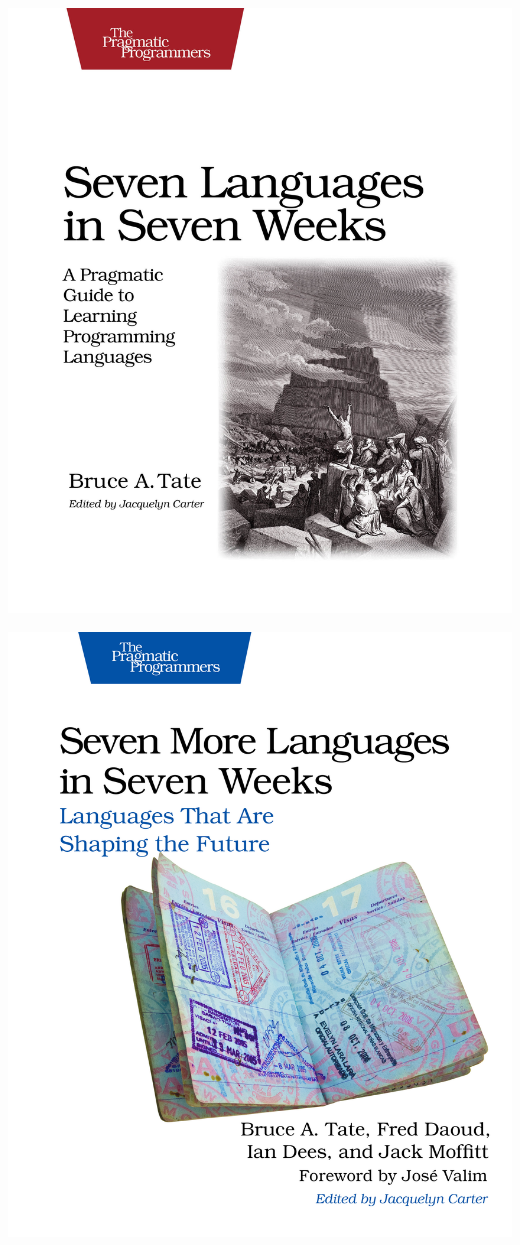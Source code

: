 \documentclass[UTF8]{beamer}
\begin{document}
\begin{frame}
  \centerline{\includegraphics[height=\textheight]{slsw.jpg}}
\end{frame}

\begin{frame}
  \centerline{\includegraphics[height=\textheight]{smlsw.jpg}}
\end{frame}
\end{document}
